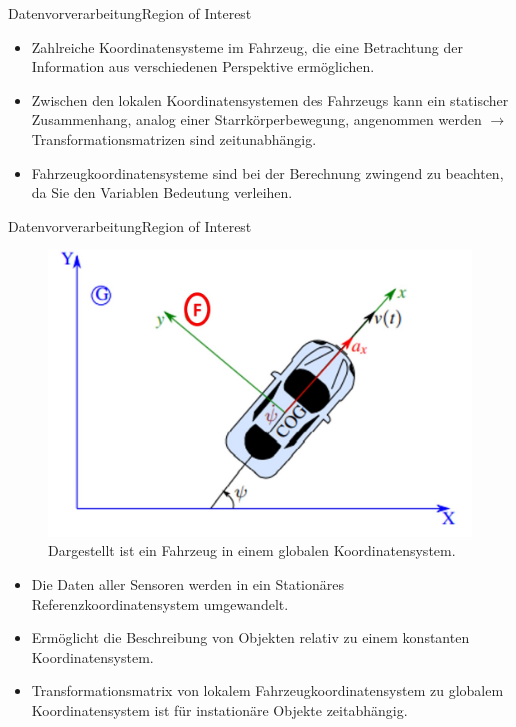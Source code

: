 \documentclass[169, handout	]{THIbeamer} %
\begin{document}
\begin{frame}{Datenvorverarbeitung}{Region of Interest}
	\begin{itemize}
		\item Zahlreiche Koordinatensysteme im Fahrzeug, die eine Betrachtung der Information aus verschiedenen Perspektive ermöglichen.
		\item Zwischen den lokalen Koordinatensystemen des Fahrzeugs kann ein statischer Zusammenhang, analog einer Starrkörperbewegung, angenommen werden $\rightarrow$ Transformationsmatrizen sind zeitunabhängig.
		\item Fahrzeugkoordinatensysteme sind bei der Berechnung zwingend zu beachten, da Sie den Variablen Bedeutung verleihen.
	\end{itemize}
\end{frame}
\begin{frame}{Datenvorverarbeitung}{Region of Interest}
	\begin{figure}
		\includegraphics[scale=0.3]{required/Globales Koordinatensystem.jpg}
		\caption{Dargestellt ist ein Fahrzeug in einem globalen Koordinatensystem.}
		\label{Globales Koordinatensystem}
	\end{figure}
	\begin{itemize}
		\item Die Daten aller Sensoren werden in ein Stationäres Referenzkoordinatensystem umgewandelt.
		\item Ermöglicht die Beschreibung von Objekten relativ zu einem konstanten Koordinatensystem.
		\item Transformationsmatrix von lokalem Fahrzeugkoordinatensystem zu globalem Koordinatensystem ist für instationäre Objekte zeitabhängig.
	\end{itemize}					
\end{frame}
\end{document}
